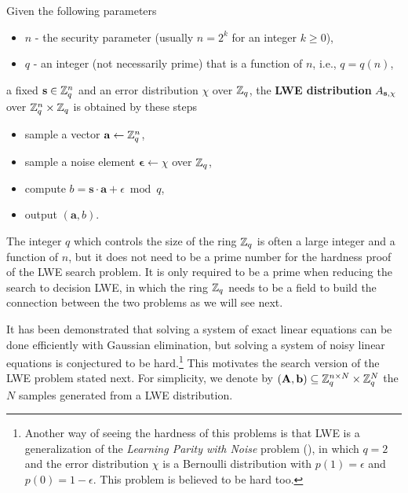 \documentclass[../main.tex]{subfiles}
\begin{document}
\begin{definition}
\label{def:lweDist}
Given the following parameters 
\begin{itemize}\itemsep1mm\parskip0mm
    \item $n$ - the security parameter (usually $n=2^k$ for an integer $k \ge 0$),
    \item $q$ - an integer (not necessarily prime) that is a function of $n$, i.e., $q=q(n)$,
\end{itemize}
a fixed $\mathbf{s} \in \mathbb{Z}_q^n$ and an error distribution $\chi$ over $\mathbb{Z}_q$, %
the 
\reversemarginpar
{}
\textbf{LWE distribution}  $A_{\mathbf{s},\chi}$ over $\mathbb{Z}_q^n \times \mathbb{Z}_q$ is obtained by these steps
\begin{itemize}\itemsep1mm\parskip0mm
    \item sample a vector $\mathbf{a} \leftarrow \mathbb{Z}_q^n$,
    \item sample a noise element $\mathbf{\epsilon} \leftarrow \chi$ over $\mathbb{Z}_q$, 
    \item compute $b = \mathbf{s} \cdot \mathbf{a} + \epsilon \bmod q$,
    \item output $(\mathbf{a}, b)$.
\end{itemize}
\end{definition}

The integer $q$ which controls the size of the ring $\mathbb{Z}_q$ is often a large integer and a function of $n$, but it does not need to be a prime number for the hardness proof of the LWE search problem. It is only required to be a prime when reducing the search to decision LWE, in which the ring $\mathbb{Z}_q$ needs to be a field to build the connection between the two problems as we will see next. 

It has been demonstrated that solving a system of exact linear equations can be done efficiently with Gaussian elimination, but solving a system of noisy linear equations is conjectured to be hard.\footnote{Another way of seeing the hardness of this problems is that LWE is a generalization of the \textit{Learning Parity with Noise} problem (\cite{pietrzak12}), in which $q=2$ and the error distribution $\chi$ is a Bernoulli distribution with $p(1)=\epsilon$ and $p(0)=1-\epsilon$. This problem is believed to be hard too.} This motivates the search version of the LWE problem stated next. For simplicity, we denote by $(\mathbf{A},\mathbf{b}) \subseteq \mathbb{Z}_q^{n \times N} \times \mathbb{Z}_q^N$ the $N$ samples generated from a LWE distribution. 
\end{document}
